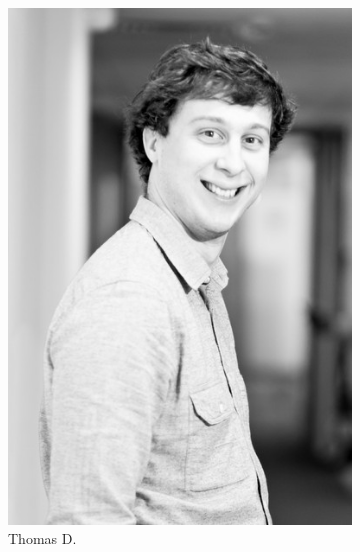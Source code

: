 \begin{figure}[h!]
\begin{subfigure}[b]{0.2\textwidth}
                \label{fig:christian}
            \end{subfigure}
            \begin{subfigure}[b]{0.2\textwidth}
                \includegraphics[width=\textwidth]{images/thomas2-Copier-Copier.jpg}
                \caption{Thomas D.}
            \end{subfigure}
            \begin{subfigure}[b]{0.2\textwidth}

\end{subfigure}
\end{figure}

